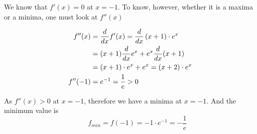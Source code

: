 \documentclass[14pt,fleqn]{extarticle}
\newcommand\dfx{\left(x+1 \right)\cdot e^x }
\newcommand\ddfx{ \left(x+2 \right)\cdot e^x }
\begin{document}
\begin{question}
\begin{step}
     We know that $f'(x) = 0$ at $x=-1$. To know, however, whether it is a maxima or a minima, one must look at $f''(x)$ 
     
     \begin{align}
	f''(x) &= \ddx f'(x) = \ddx \dfx \\
	&= (x+1)\ddx e^x + e^x\ddx (x+1) \\
	&= (x+1) \cdot e^x + e^x = \ddfx \\
	f''(-1) &= e^{-1} = \frac{1}{e} > 0 
\end{align}  

As $f''(x) > 0$  at $x=-1$, therefore we have a minima at $x=-1$. And the minimum value is 
\[ \qquad f_{min} = f(-1) = -1\cdot e^{-1} = -\frac{1}{e}\]

\end{step}
\end{question} 
\end{document}
